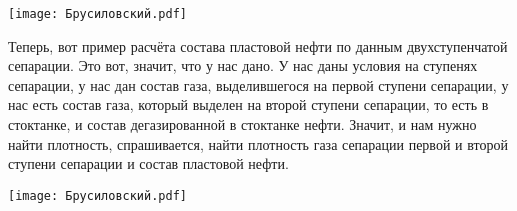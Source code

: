 \documentclass[main.tex]{subfiles}
\begin{document}
\begin{center}
\texttt{[image: Брусиловский.pdf]}
\end{center}

Теперь, вот пример расчёта состава пластовой нефти по данным двухступенчатой сепарации.
Это вот, значит, что у нас дано.
У нас даны условия на ступенях сепарации, у нас дан состав газа, выделившегося на первой ступени сепарации, у нас есть состав газа, который выделен на второй ступени сепарации, то есть в стоктанке, и состав дегазированной в стоктанке нефти.
Значит, и нам нужно найти плотность, спрашивается, найти плотность газа сепарации первой и второй ступени сепарации и состав пластовой нефти.

\begin{center}
\texttt{[image: Брусиловский.pdf]}
\end{center}
\end{document}
